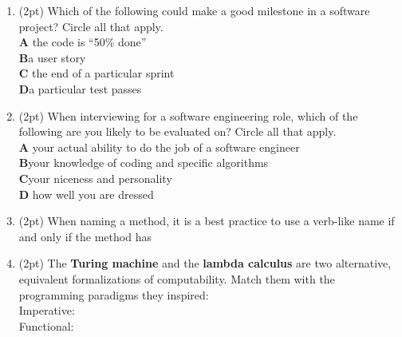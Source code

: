 \documentclass{report}
\newif\ifkey
\newcommand{\correct}[1]{\ifkey\color{red}\textbf{#1}\color{black}\else\textbf{#1}\fi\xspace}
\newcommand{\answershort}[1]{\ifkey\color{red}\underline{\textbf{#1}}\color{black}\else\underline{\hspace{3in}}\fi\xspace}
\newcommand*{\pts}[1]{\addtocounter{points}{#1}(#1pt)}
\begin{document}
\begin{spacing}{1.4}
\begin{enumerate}[leftmargin=*]
\item \pts{2}
  Which of the following could make a good milestone in a software project? Circle all that apply.
  \\ \textbf{A}\hspace{0.2in} the code is ``50\% done''
  \\ \correct{B}\hspace{0.2in}a user story
  \\ \textbf{C}\hspace{0.2in} the end of a particular sprint
  \\ \correct{D}\hspace{0.2in}a particular test passes

\item \pts{2}
  When interviewing for a software engineering role, which of the following are you likely to be evaluated on? Circle all that apply.
  \\ \textbf{A}\hspace{0.2in} your actual ability to do the job of a software engineer
  \\ \correct{B}\hspace{0.2in}your knowledge of coding and specific algorithms
  \\ \correct{C}\hspace{0.2in}your niceness and personality
  \\ \textbf{D}\hspace{0.2in} how well you are dressed
  

\item \pts{2}
  When naming a method, it is a best practice to use a verb-like name if and only if the method has \answershort{side-effects}



\item \pts{2}
  The \textbf{Turing machine} and the \textbf{lambda calculus} are two alternative, equivalent formalizations of computability.
  Match them with the programming paradigms they inspired: \\
  Imperative: \answershort{Turing machine} \\
  Functional: \answershort{lambda calculus}


\end{enumerate}
\end{spacing}
\end{document}
